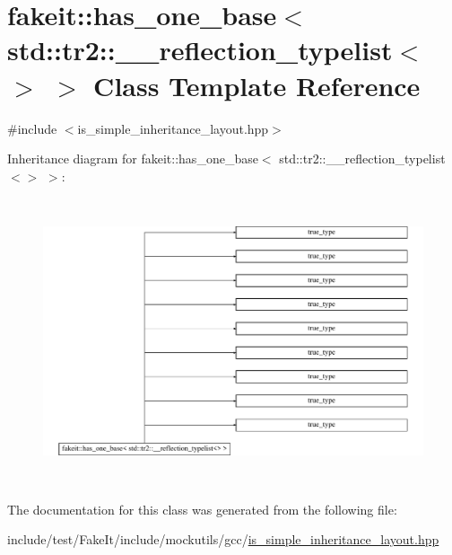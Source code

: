 \hypertarget{classfakeit_1_1has__one__base_3_01std_1_1tr2_1_1____reflection__typelist_3_4_01_4}{}\section{fakeit\+::has\+\_\+one\+\_\+base$<$ std\+::tr2\+::\+\_\+\+\_\+reflection\+\_\+typelist$<$$>$ $>$ Class Template Reference}
\label{classfakeit_1_1has__one__base_3_01std_1_1tr2_1_1____reflection__typelist_3_4_01_4}


{\ttfamily \#include $<$is\+\_\+simple\+\_\+inheritance\+\_\+layout.\+hpp$>$}

Inheritance diagram for fakeit\+::has\+\_\+one\+\_\+base$<$ std\+::tr2\+::\+\_\+\+\_\+reflection\+\_\+typelist$<$$>$ $>$\+:\begin{figure}[H]
\begin{center}
\leavevmode
\includegraphics[height=8.433735cm]{classfakeit_1_1has__one__base_3_01std_1_1tr2_1_1____reflection__typelist_3_4_01_4}
\end{center}
\end{figure}


The documentation for this class was generated from the following file\+:\begin{DoxyCompactItemize}
\item 
include/test/\+Fake\+It/include/mockutils/gcc/\mbox{\hyperlink{is__simple__inheritance__layout_8hpp}{is\+\_\+simple\+\_\+inheritance\+\_\+layout.\+hpp}}\end{DoxyCompactItemize}
